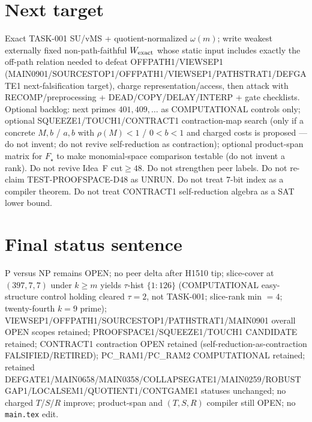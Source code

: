 \documentclass[11pt]{article}
\begin{document}
\section*{Next target}
Exact TASK-001 SU/vMS + quotient-normalized $\omega(m)$; write weakest externally fixed non-path-faithful
$W_{\rm exact}$ whose static input includes exactly the off-path relation needed to defeat OFFPATH1/VIEWSEP1
(MAIN0901/SOURCESTOP1/OFFPATH1/VIEWSEP1/PATHSTRAT1/DEFGATE1 next-falsification target), charge representation/access,
then attack with RECOMP/preprocessing + DEAD/COPY/DELAY/INTERP + gate checklists.
Optional backlog: next primes $401,409,\ldots$ as COMPUTATIONAL controls only;
optional SQUEEZE1/TOUCH1/CONTRACT1 contraction-map search (only if a concrete $M,b$ / $a,b$ with $\rho(M){<}1$ / $0{<}b{<}1$ and charged costs is proposed --- do not invent; do not revive self-reduction as contraction);
optional product-span matrix for $F_\star$ to make monomial-space comparison testable (do not invent a rank).
Do not revive Idea~F cut$\ge48$. Do not strengthen peer labels.
Do not re-claim TEST-PROOFSPACE-D48 as UNRUN.
Do not treat $7$-bit index as a compiler theorem.
Do not treat CONTRACT1 self-reduction algebra as a SAT lower bound.

\section*{Final status sentence}
P versus NP remains OPEN; no peer delta after H1510 tip; slice-cover at $(397,7,7)$ under $k{\ge}m$ yields $\tau$-hist $\{1{:}126\}$ (COMPUTATIONAL easy-structure control holding cleared $\tau{=}2$, not TASK-001; slice-rank min $=4$; twenty-fourth $k{=}9$ prime); VIEWSEP1/OFFPATH1/SOURCESTOP1/PATHSTRAT1/MAIN0901 overall OPEN scopes retained; PROOFSPACE1/SQUEEZE1/TOUCH1 CANDIDATE retained; CONTRACT1 contraction OPEN retained (self-reduction-as-contraction FALSIFIED/RETIRED); PC\_RAM1/PC\_RAM2 COMPUTATIONAL retained; retained DEFGATE1/MAIN0658/MAIN0358/COLLAPSEGATE1/MAIN0259/ROBUSTGAP1/LOCALSEM1/QUOTIENT1/CONTGAME1 statuses unchanged; no charged $T$/$S$/$R$ improve; product-span and $(T,S,R)$ compiler still OPEN; no \texttt{main.tex} edit.
\end{document}
